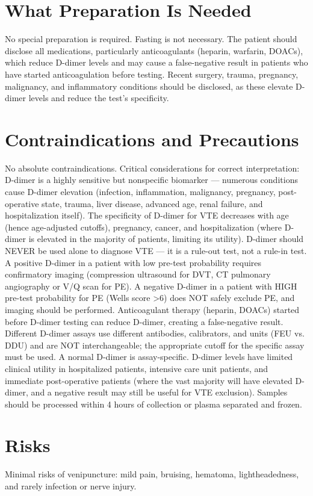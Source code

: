 \section*{What Preparation Is Needed}
No special preparation is required. Fasting is not necessary. The patient should disclose all medications, particularly anticoagulants (heparin, warfarin, DOACs), which reduce D-dimer levels and may cause a false-negative result in patients who have started anticoagulation before testing. Recent surgery, trauma, pregnancy, malignancy, and inflammatory conditions should be disclosed, as these elevate D-dimer levels and reduce the test's specificity.

\section*{Contraindications and Precautions}
No absolute contraindications. Critical considerations for correct interpretation: D-dimer is a highly sensitive but nonspecific biomarker --- numerous conditions cause D-dimer elevation (infection, inflammation, malignancy, pregnancy, post-operative state, trauma, liver disease, advanced age, renal failure, and hospitalization itself). The specificity of D-dimer for VTE decreases with age (hence age-adjusted cutoffs), pregnancy, cancer, and hospitalization (where D-dimer is elevated in the majority of patients, limiting its utility). D-dimer should NEVER be used alone to diagnose VTE --- it is a rule-out test, not a rule-in test. A positive D-dimer in a patient with low pre-test probability requires confirmatory imaging (compression ultrasound for DVT, CT pulmonary angiography or V/Q scan for PE). A negative D-dimer in a patient with HIGH pre-test probability for PE (Wells score >6) does NOT safely exclude PE, and imaging should be performed. Anticoagulant therapy (heparin, DOACs) started before D-dimer testing can reduce D-dimer, creating a false-negative result. Different D-dimer assays use different antibodies, calibrators, and units (FEU vs. DDU) and are NOT interchangeable; the appropriate cutoff for the specific assay must be used. A normal D-dimer is assay-specific. D-dimer levels have limited clinical utility in hospitalized patients, intensive care unit patients, and immediate post-operative patients (where the vast majority will have elevated D-dimer, and a negative result may still be useful for VTE exclusion). Samples should be processed within 4 hours of collection or plasma separated and frozen.

\section*{Risks}
Minimal risks of venipuncture: mild pain, bruising, hematoma, lightheadedness, and rarely infection or nerve injury.

